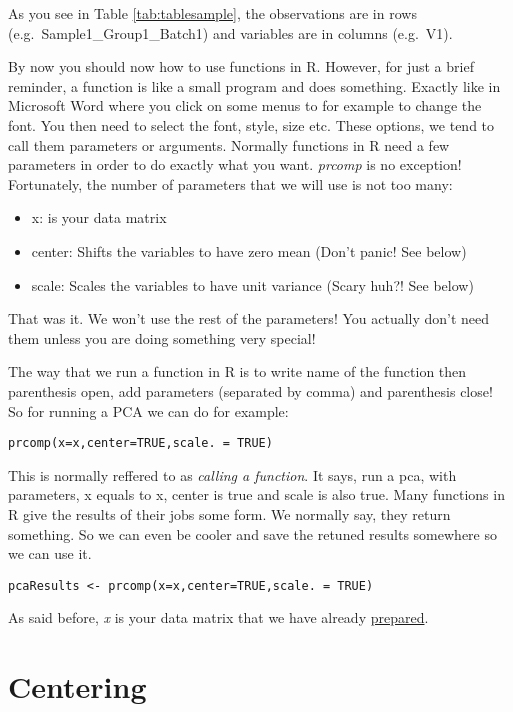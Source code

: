 \documentclass[
]{book}
\providecommand{\tightlist}{%
  \setlength{\itemsep}{0pt}\setlength{\parskip}{0pt}}
\theoremstyle{definition}
\theoremstyle{definition}
\theoremstyle{definition}
\theoremstyle{remark}
\begin{document}
As you see in Table \ref{tab:tablesample}, the observations are in rows (e.g.~Sample1\_Group1\_Batch1) and variables are in columns (e.g.~V1).

By now you should now how to use functions in R. However, for just a brief reminder, a function is like a small program and does something. Exactly like in Microsoft Word where you click on some menus to for example to change the font. You then need to select the font, style, size etc. These options, we tend to call them parameters or arguments. Normally functions in R need a few parameters in order to do exactly what you want. \emph{prcomp} is no exception! Fortunately, the number of parameters that we will use is not too many:

\begin{itemize}
\tightlist
\item
  x: is your data matrix
\item
  center: Shifts the variables to have zero mean (Don't panic! See below)
\item
  scale: Scales the variables to have unit variance (Scary huh?! See below)
\end{itemize}

That was it. We won't use the rest of the parameters! You actually don't need them unless you are doing something very special!

The way that we run a function in R is to write name of the function then parenthesis open, add parameters (separated by comma) and parenthesis close! So for running a PCA we can do for example:

\begin{verbatim}
prcomp(x=x,center=TRUE,scale. = TRUE)
\end{verbatim}

This is normally reffered to as \emph{calling a function}. It says, run a pca, with parameters, x equals to x, center is true and scale is also true. Many functions in R give the results of their jobs some form. We normally say, they return something. So we can even be cooler and save the retuned results somewhere so we can use it.

\begin{verbatim}
pcaResults <- prcomp(x=x,center=TRUE,scale. = TRUE)
\end{verbatim}

As said before, \emph{x} is your data matrix that we have already \protect\hyperlink{tablesample}{prepared}.

\hypertarget{centering}{%
\section{Centering}\label{centering}}
\end{document}
